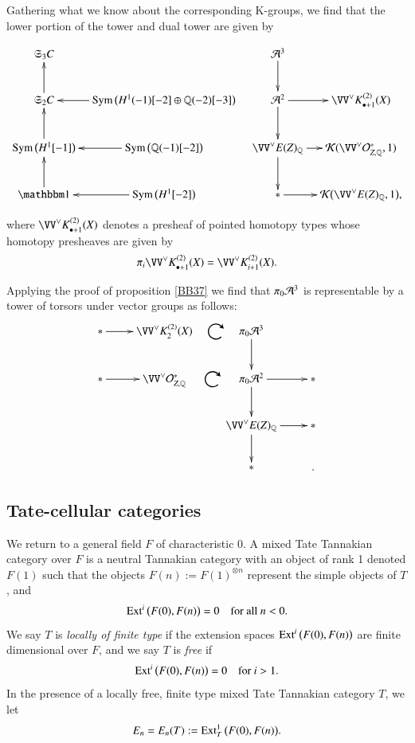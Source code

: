 \sspar{}
\label{EB16}
Gathering what we know about the corresponding K-groups, we find that the lower portion of the tower and dual tower are given by
\begin{footnotesize}
\[
\xymatrix
@ C = 2ex
{
\fkS_3C && 
\Aa^3 \ar[d]
\\
\fkS_2C \ar[u] & \Sym \big(H^1(-1)[-2] \oplus \QQ(-2)[-3]\big) \ar[l]
& \Aa^2 \ar[d] \ar[r]
&\VV^\lor K^{(2)}_{\bullet +1}(X)
\\
\Sym \big(H^1[-1]\big) \ar[u] & \Sym \big(\QQ(-1)[-2]\big)  \ar[l]
& \VV^\lor E(Z)_\QQ \ar[d] \ar[r]
& \Kk(\VV^\lor \Oo^*_{Z, \QQ}, 1) 
\\
\one \ar[u] &
\Sym \big(H^1[-2]\big) \ar[l]
& 
\ast \ar[r]
&
\Kk \big( \VV^\lor E(Z)_\QQ, 1 \big),
}
\]
\end{footnotesize}
where $\VV^\lor K^{(2)}_{\bullet+1}(X)$ denotes a presheaf of pointed homotopy types whose homotopy presheaves are given by
\[
\pi_i \VV^\lor K^{(2)}_{\bullet+1}(X) = 
\VV^\lor K^{(2)}_{i+1}(X).
\]


\sspar{}
\label{EB17}
Applying the proof of proposition \ref{BB37} we find that $\pi_0 \mathcal{A}^3$ is representable by a tower of torsors under vector groups as follows:
\[
\xymatrix{
\ast \ar[r] & \VV^\lor K^{(2)}_2(X)
\ar@{}[r]|-{\rotatebox{-90}{\scalebox{2}{$\circlearrowright$}}} & \pi_0 \Aa^3 \ar[d]
\\
\ast \ar[r] & \VV^\lor  \Oo^*_{Z, \QQ}
\ar@{}[r]|-{\rotatebox{-90}{\scalebox{2}{$\circlearrowright$}}}
& \pi_0 \Aa^2 \ar[r] \ar[d] & \ast
\\
&& \VV^\lor E(Z)_\QQ \ar[r] \ar[d] & \ast
\\
&& \ast &.
}
\]

\subsection{Tate-cellular categories}
\label{sSec:TCell}


\sspar{}
\label{KG48}
We return to a general field $F$ of characteristic 0. A mixed Tate Tannakian category over $F$ is a neutral Tannakian category with an object of rank 1 denoted $F(1)$ such that the objects $F(n) := F(1)^{\otimes n}$ represent the simple objects of $T$, and
\[
\operatorname{Ext}^i \big(F(0), F(n) \big) = 0
\quad \text{for all } n<0.
\]
We say $T$ is \emph{locally of finite type} if the extension spaces $\operatorname{Ext}^i \big( F(0), F(n) \big)$ are finite dimensional over $F$, and we say $T$ is \emph{free} if
\[
\operatorname{Ext}^i \big( F(0), F(n) \big) = 0 \quad \text{for } i >1. 
\]
In the presence of a locally free, finite type mixed Tate Tannakian category $T$, we let
\[
E_n = E_n(T) := \operatorname{Ext}^1_T 
\big( F(0), F(n) \big).
\]


